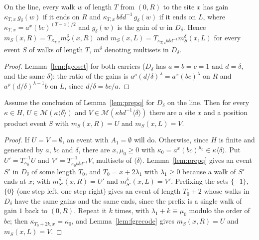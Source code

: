 \begin{lemma}[recoding]\label{lem:fgrecode}
On the line, every walk $w$ of length $T$ from $(0,R)$ to the site $x$ has gain $\kappa_{T,x}\,g_\delta(w)$ if it ends on $R$ and $\kappa_{T,x}\,b\delta d^{-1}\,g_\delta(w)$ if it ends on $L$, where $\kappa_{T,x}=a^{x}(bc)^{(T-x)/2}$ and $g_\delta(w)$ is the gain of $w$ in $D_\delta$. Hence $m_S(x,R)=T_{\kappa_{T,x}}m^{\delta}_S(x,R)$ and $m_S(x,L)=T_{\kappa_{T,x}b\delta d^{-1}}m^{\delta}_S(x,L)$ for every event $S$ of walks of length $T$, $m^\delta$ denoting multisets in $D_\delta$.
\end{lemma}
\begin{proof}
Lemma~\ref{lem:fgcoset} for both carriers ($D_\delta$ has $a=b=c=1$ and $d=\delta$, and the same $\delta$): the ratio of the gains is $a^{\rho}(d/\delta)^{\lambda}=a^{x}(bc)^{\lambda}$ on $R$ and $a^{\rho}(d/\delta)^{\lambda-1}b$ on $L$, since $d/\delta=bc/a$.
\end{proof}

\begin{proposition}\label{prop:fgprep}
Assume the conclusion of Lemma~\ref{lem:prepq} for $D_\delta$ on the line. Then for every $\kappa\in H$, $U\in\mathcal{M}(\kappa\langle\delta\rangle)$ and $V\in\mathcal{M}(\kappa bd^{-1}\langle\delta\rangle)$ there are a site $x$ and a position product event $S$ with $m_S(x,R)=U$ and $m_S(x,L)=V$.
\end{proposition}
\begin{proof}
If $U=V=\emptyset$, an event with $A_1=\emptyset$ will do. Otherwise, since $H$ is finite and generated by $a$, $bc$ and $\delta$, there are $x,\mu_0\ge0$ with $\kappa_0=a^{x}(bc)^{\mu_0}\in\kappa\langle\delta\rangle$. Put $U'=T_{\kappa_0}^{-1}U$ and $V'=T_{\kappa_0b\delta d^{-1}}^{-1}V$, multisets of $\langle\delta\rangle$. Lemma~\ref{lem:prepq} gives an event $S'$ in $D_\delta$ of some length $T_0$, and $T_0=x+2\lambda_1$ with $\lambda_1\ge0$ because a walk of $S'$ ends at $x$; with $m^\delta_{S'}(x,R)=U'$ and $m^\delta_{S'}(x,L)=V'$. Prefixing the sets $\{-1\}$, $\{0\}$ (one step left, one step right) gives an event of length $T_0+2$ whose walks in $D_\delta$ have the same gains and the same ends, since the prefix is a single walk of gain $1$ back to $(0,R)$. Repeat it $k$ times, with $\lambda_1+k\equiv\mu_0$ modulo the order of $bc$; then $\kappa_{T_0+2k,x}=\kappa_0$, and Lemma~\ref{lem:fgrecode} gives $m_S(x,R)=U$ and $m_S(x,L)=V$.
\end{proof}


